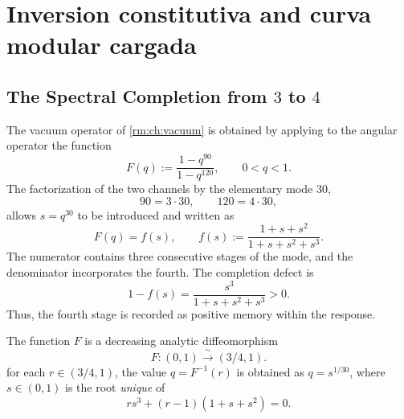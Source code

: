\chapter{Inversion constitutiva and curva modular cargada}
\label{rm:chap:curva-modular-reconstruccion}

\section{The Spectral Completion from \(3\) to \(4\)}

The vacuum operator of \cref{rm:ch:vacuum} is obtained by applying to the
angular operator the function
\begin{equation}
 F(q):=\frac{1-q^{90}}{1-q^{120}},
 \qquad 0<q<1.
 \label{rm:eq:curve-Fq}
\end{equation}
The factorization of the two channels by the elementary mode \(30\),
\begin{equation}
 90=3\cdot30,
 \qquad
 120=4\cdot30,
 \label{rm:eq:curve-90-120}
\end{equation}
allows \(s=q^{30}\) to be introduced and written as
\begin{equation}
 F(q)=f(s),
 \qquad
 f(s):=\frac{1+s+s^2}{1+s+s^2+s^3}.
 \label{rm:eq:curve-fs}
\end{equation}
The numerator contains three consecutive stages of the mode, and the denominator
incorporates the fourth. The completion defect is
\begin{equation}
 1-f(s)=\frac{s^3}{1+s+s^2+s^3}>0.
 \label{rm:eq:curve-completion-defect}
\end{equation}
Thus, the fourth stage is recorded as positive memory within the
response.

\begin{theorem}
\label{rm:thm:curve-F-bijection}
The function \(F\) is a decreasing analytic diffeomorphism
\begin{equation}
 \boxed{F:(0,1)\xrightarrow{\;\sim\;}(3/4,1).}
 \label{rm:eq:curve-F-range}
\end{equation}
for each \(r\in(3/4,1)\), the value \(q=F^{-1}(r)\) is obtained as
\(q=s^{1/30}\), where \(s\in(0,1)\) is the root \emph{unique} of
\begin{equation}
 r s^3+(r-1)(1+s+s^2)=0.
 \label{rm:eq:curve-inverse-cubic}
\end{equation}
\end{theorem}

